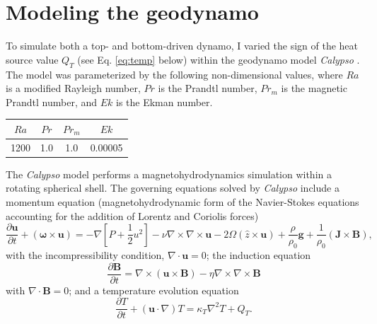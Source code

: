 \documentclass[12pt,letterpaper]{article}
\begin{document}
\section*{Modeling the geodynamo}
To simulate both a top- and bottom-driven dynamo, I varied the sign of the heat source value $Q_T$ (see Eq. \ref{eq:temp} below) within the geodynamo model \textit{Calypso} \citep{Matsui2014a}. The model was parameterized by the following non-dimensional values, where $Ra$ is a modified Rayleigh number, $Pr$ is the Prandtl number, $Pr_m$ is the magnetic Prandtl number, and $Ek$ is the Ekman number. 

\begin{tabular}{cccc}
\toprule
$Ra$ &  $Pr$ &  $Pr_m$ &     $Ek$ \\
\midrule
1200 &   1.0 &     1.0 &  0.00005 \\
\bottomrule
\end{tabular}



The \textit{Calypso} model performs a magnetohydrodynamics simulation within a rotating spherical shell. The governing equations solved by \textit{Calypso} include a momentum equation (magnetohydrodynamic form of the Navier-Stokes equations accounting for the addition of Lorentz and Coriolis forces) 
\begin{equation}\label{eq:momentum}
\frac{\partial \mathbf{u}}{\partial t} + (\boldsymbol{\omega}\times\mathbf{u}) = -\nabla[P+\frac{1}{2}u^2] - \nu\nabla\times\nabla\times\mathbf{u} - 2\Omega(\hat{z}\times\mathbf{u}) + \frac{\rho}{\rho_0}\mathbf{g} + \frac{1}{\rho_0}(\mathbf{J}\times\mathbf{B}),
\end{equation}
with the incompressibility condition, $\nabla\cdot\mathbf{u}=0$; the induction equation 
\begin{equation}\label{eq:induction}
\frac{\partial \mathbf{B}}{\partial t}=\nabla\times(\mathbf{u}\times\mathbf{B})-\eta\nabla\times\nabla\times\mathbf{B}
\end{equation}
with $\nabla\cdot\mathbf{B}=0$; and a temperature evolution equation
\begin{equation}\label{eq:temp}
\frac{\partial T}{\partial t}+(\mathbf{u}\cdot\nabla)T = \kappa_T\nabla^2T + Q_T.
\end{equation}
\end{document}
